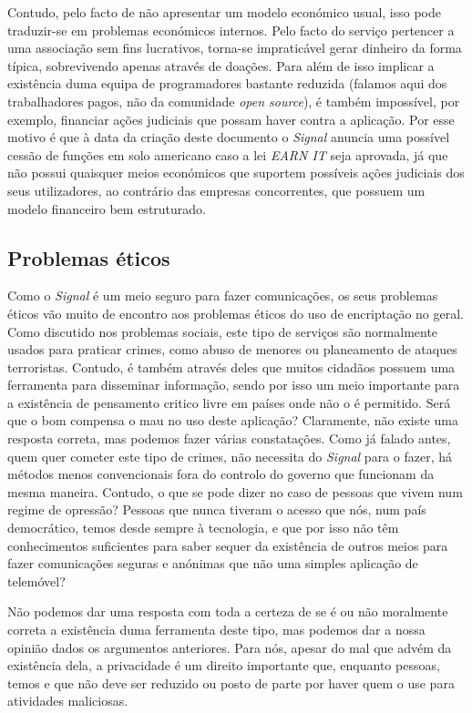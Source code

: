 Contudo, pelo facto de não apresentar um modelo económico usual, isso pode traduzir-se em problemas económicos internos. Pelo facto do serviço pertencer a uma associação sem fins lucrativos, torna-se impraticável gerar dinheiro da forma típica, sobrevivendo apenas através de doações. Para além de isso implicar a existência duma equipa de programadores bastante reduzida (falamos aqui dos trabalhadores pagos, não da comunidade \textit{open source}), é também impossível, por exemplo, financiar ações judiciais que possam haver contra a aplicação. Por esse motivo é que à data da criação deste documento o \textit{Signal} anuncia uma possível cessão de funções em solo americano caso a lei \textit{EARN IT} seja aprovada, já que não possui quaisquer meios económicos que suportem possíveis ações judiciais dos seus utilizadores, ao contrário das empresas concorrentes, que possuem um modelo financeiro bem estruturado.


\subsection{Problemas éticos}
Como o \textit{Signal} é um meio seguro para fazer comunicações, os seus problemas éticos vão muito de encontro aos problemas éticos do uso de encriptação no geral. Como discutido nos problemas sociais, este tipo de serviços são normalmente usados para praticar crimes, como abuso de menores ou planeamento de ataques terroristas. Contudo, é também através deles que muitos cidadãos possuem uma ferramenta para disseminar informação, sendo por isso um meio importante para a existência de pensamento critico livre em países onde não o é permitido. Será que o bom compensa o mau no uso deste aplicação? Claramente, não existe uma resposta correta, mas podemos fazer várias constatações. Como já falado antes, quem quer cometer este tipo de crimes, não necessita do \textit{Signal} para o fazer, há métodos menos convencionais fora do controlo do governo que funcionam da mesma maneira. Contudo, o que se pode dizer no caso de pessoas que vivem num regime de opressão? Pessoas que nunca tiveram o acesso que nós, num país democrático, temos desde sempre à tecnologia, e que por isso não têm conhecimentos suficientes para saber sequer da existência de outros meios para fazer comunicações seguras e anónimas que não uma simples aplicação de telemóvel? 

Não podemos dar uma resposta com toda a certeza de se é ou não moralmente correta a existência duma ferramenta deste tipo, mas podemos dar a nossa opinião dados os argumentos anteriores. Para nós, apesar do mal que advém da existência dela, a privacidade é um direito importante que, enquanto pessoas, temos e que não deve ser reduzido ou posto de parte por haver quem o use para atividades maliciosas.
